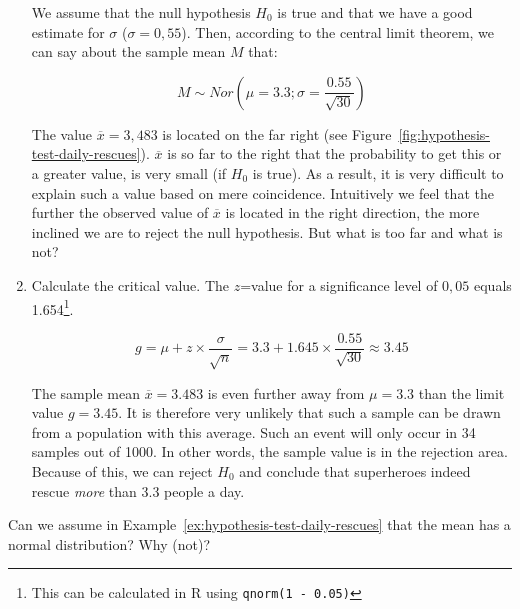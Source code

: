 \begin{example}
\begin{enumerate}
    We assume that the null hypothesis $H_{0}$ is true and that we have a good estimate for $\sigma$ ($\sigma = 0,55$). Then, according to the central limit theorem, we can say about the sample mean $M$ that:

    \[M \sim  Nor(\mu = 3.3; \sigma = \frac{0.55}{\sqrt{30}})\]

    The value $\overline{x} = 3,483$ is located on the far right (see Figure~\ref{fig:hypothesis-test-daily-rescues}). $\overline{x} $ is so far to the right that the probability to get this or a greater value, is very small (if $H_{0}$ is true). As a result, it is very difficult to explain such a value based on mere coincidence. Intuitively we feel that the further the observed value of $\overline{x}$ is located in the right direction, the more inclined we are to reject the null hypothesis. But what is too far and what is not?
    
    \item Calculate the critical value. The $z$=value for a significance level of $0,05$ equals 1.654\footnote{This can be calculated in R using \texttt{qnorm(1 - 0.05)}}.
    
    \[ g = \mu + z \times \frac{\sigma}{\sqrt{n}} = 3.3 + 1.645 \times \frac{0.55}{\sqrt{30}} \approx 3.45 \]
    
    The sample mean $\overline{x} = 3.483 $ is even further away from $\mu = 3.3$ than the limit value $g = 3.45$. It is therefore very unlikely that such a sample can be drawn from a population with this average. Such an event will only occur in 34 samples out of 1000. In other words, the sample value is in the rejection area. Because of this, we can reject $H_0$ and conclude that superheroes indeed rescue \emph{more} than 3.3 people a day.

  \end{enumerate}

\end{example}

\begin{exercise}
  Can we assume in Example~\ref{ex:hypothesis-test-daily-rescues} that the mean has a normal distribution? Why (not)?
\end{exercise}

